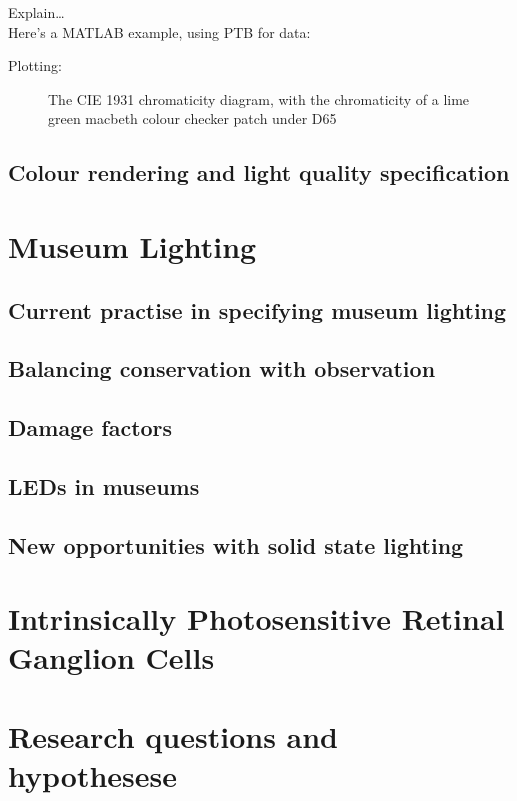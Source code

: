 Explain\dots \\
Here's a \gls{MATLAB} example, using \gls{PTB} for data:



Plotting: 



\begin{figure}[htbp]
\caption{The CIE 1931 chromaticity diagram, with the chromaticity of a lime green macbeth colour checker patch under D65}
\label{fig:1931}
\end{figure}







\subsection{Colour rendering and light quality specification}

\section{Museum Lighting}
\subsection{Current practise in specifying museum lighting}
\subsection{Balancing conservation with observation}
\subsection{Damage factors}
\subsection{LEDs in museums}
\subsection{New opportunities with solid state lighting}


\section{Intrinsically Photosensitive Retinal Ganglion Cells}
\section{Research questions and hypothesese}
